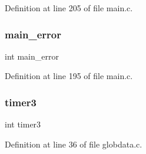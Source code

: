 Definition at line 205 of file main.\+c.

\mbox{\label{_can_bus_s_d_o_8c_a7ffc28e9156b38574a5031086c1cbf0f}} 
\subsubsection{main\+\_\+error}
{\footnotesize\ttfamily int main\+\_\+error}



Definition at line 195 of file main.\+c.

\mbox{\label{_can_bus_s_d_o_8c_a0976503fef01ed7144670e9ffde047b4}} 
\subsubsection{timer3}
{\footnotesize\ttfamily int timer3}



Definition at line 36 of file globdata.\+c.

